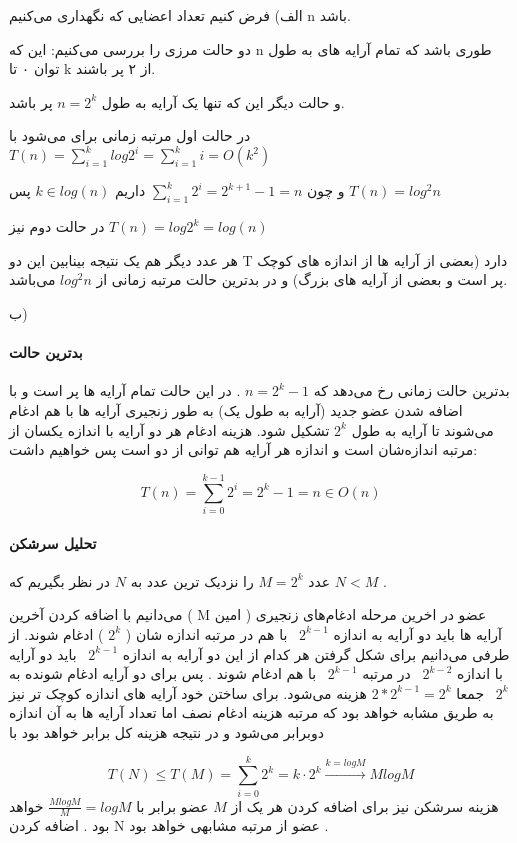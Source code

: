 الف)
فرض کنیم تعداد اعضایی که نگهداری می‌کنیم 
n
باشد.

دو حالت مرزی را بررسی می‌کنیم:
این که 
n 
طوری باشد که 
تمام آرایه های 
به طول 
توان ۰ تا 
k
از ۲ 
پر باشند.

و حالت دیگر این که 
تنها یک آرایه 
به طول 
$n = 2^k$
پر باشد.

در حالت اول مرتبه زمانی برای می‌شود با 
$T(n) = \sum_{i=1}^{k} log {2^i} = \sum_{i=1}^{k} i = O(k^2)$

و چون 
$\sum_{i=1}^{k} 2^i = 2^{k+1} - 1 = n$
داریم 
$k \in log(n)$ 
پس 
$T(n) = log^2 n$

در حالت دوم نیز 
$T(n) = log 2^k = log (n)$

هر عدد دیگر هم 
یک نتیجه بینابین این دو 
T 
دارد 
(بعضی از آرایه ها از اندازه های کوچک پر است و بعضی از آرایه های بزرگ)
و
در بدترین حالت 
مرتبه زمانی از 
$log^2 n$ 
می‌باشد.

ب)
\paragraph{بدترین حالت}
بدترین حالت زمانی رخ می‌دهد که 
$n= 2^{k}-1$
.
در این حالت تمام آرایه ها پر است 
و با اضافه شدن عضو 
جدید 
(آرایه به طول یک)
به طور زنجیری آرایه ها با هم 
ادغام می‌شوند 
تا آرایه به طول 
$2^k$
تشکیل شود.
هزینه ادغام هر دو آرایه با اندازه یکسان از مرتبه 
اندازه‌شان است و
اندازه هر آرایه هم توانی از دو است
پس خواهیم داشت:

\begin{equation*}
    T(n) = \sum_{i=0}^{k-1}2^i = 2^k-1 = n \in O(n)
\end{equation*}
\paragraph{تحلیل سرشکن}
عدد 
$M=2^k$
را نزدیک ترین عدد به
$N$
در نظر بگیریم که
$N < M$
.

می‌دانیم با اضافه کردن آخرین 
(
M
 امین
)
عضو 
در اخرین مرحله ادغام‌های زنجیری
آرایه ها 
باید دو
آرایه به اندازه 
$2^{k-1}$ 
با هم در مرتبه اندازه شان
( 
$2^k$
)
ادغام شوند. از طرفی می‌دانیم برای شکل گرفتن هر کدام از این
دو آرایه 
به اندازه
$2^{k-1}$ 
باید 
دو آرایه با اندازه 
$2^{k-2}$ 
در مرتبه 
$2^{k-1}$ 
با هم ادغام شوند 
.
پس برای دو آرایه ادغام شونده به 
$2^{k}$ 
جمعا 
$2*2^{k-1} = 2^k$
هزینه می‌شود. 
برای ساختن خود آرایه های اندازه کوچک تر نیز به طریق مشابه خواهد بود که مرتبه هزینه ادغام نصف اما تعداد آرایه ها به آن اندازه دوبرابر می‌شود و در نتیجه  
هزینه کل برابر خواهد بود با

\begin{equation*}
    T(N) \leq T(M) = \sum_{i=0}^{k} 2^k = k \cdot 2^k \xrightarrow{k = log M} M log M
\end{equation*}
هزینه سرشکن نیز برای اضافه کردن هر یک از 
$M$
عضو برابر با 
$\frac{MlogM}{M}= logM$
خواهد بود
.
اضافه کردن 
N 
عضو 
از مرتبه مشابهی خواهد بود
.

